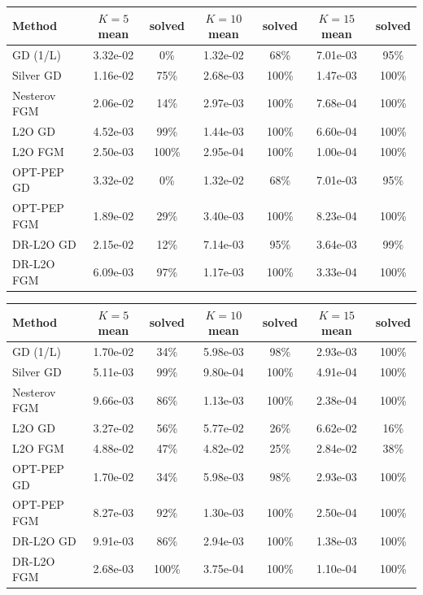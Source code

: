 \begin{tabular}{lcccccc}
\toprule
Method & $K=5$ mean & solved & $K=10$ mean & solved & $K=15$ mean & solved \\
\midrule
GD (1/L) & 3.32e-02 & 0\% & 1.32e-02 & 68\% & 7.01e-03 & 95\% \\
Silver GD & 1.16e-02 & 75\% & 2.68e-03 & 100\% & 1.47e-03 & 100\% \\
Nesterov FGM & 2.06e-02 & 14\% & 2.97e-03 & 100\% & 7.68e-04 & 100\% \\
L2O GD & 4.52e-03 & 99\% & 1.44e-03 & 100\% & 6.60e-04 & 100\% \\
L2O FGM & 2.50e-03 & 100\% & 2.95e-04 & 100\% & 1.00e-04 & 100\% \\
OPT-PEP GD & 3.32e-02 & 0\% & 1.32e-02 & 68\% & 7.01e-03 & 95\% \\
OPT-PEP FGM & 1.89e-02 & 29\% & 3.40e-03 & 100\% & 8.23e-04 & 100\% \\
DR-L2O GD & 2.15e-02 & 12\% & 7.14e-03 & 95\% & 3.64e-03 & 99\% \\
DR-L2O FGM & 6.09e-03 & 97\% & 1.17e-03 & 100\% & 3.33e-04 & 100\% \\
\bottomrule
\end{tabular}

\begin{tabular}{lcccccc}
\toprule
Method & $K=5$ mean & solved & $K=10$ mean & solved & $K=15$ mean & solved \\
\midrule
GD (1/L) & 1.70e-02 & 34\% & 5.98e-03 & 98\% & 2.93e-03 & 100\% \\
Silver GD & 5.11e-03 & 99\% & 9.80e-04 & 100\% & 4.91e-04 & 100\% \\
Nesterov FGM & 9.66e-03 & 86\% & 1.13e-03 & 100\% & 2.38e-04 & 100\% \\
L2O GD & 3.27e-02 & 56\% & 5.77e-02 & 26\% & 6.62e-02 & 16\% \\
L2O FGM & 4.88e-02 & 47\% & 4.82e-02 & 25\% & 2.84e-02 & 38\% \\
OPT-PEP GD & 1.70e-02 & 34\% & 5.98e-03 & 98\% & 2.93e-03 & 100\% \\
OPT-PEP FGM & 8.27e-03 & 92\% & 1.30e-03 & 100\% & 2.50e-04 & 100\% \\
DR-L2O GD & 9.91e-03 & 86\% & 2.94e-03 & 100\% & 1.38e-03 & 100\% \\
DR-L2O FGM & 2.68e-03 & 100\% & 3.75e-04 & 100\% & 1.10e-04 & 100\% \\
\bottomrule
\end{tabular}
